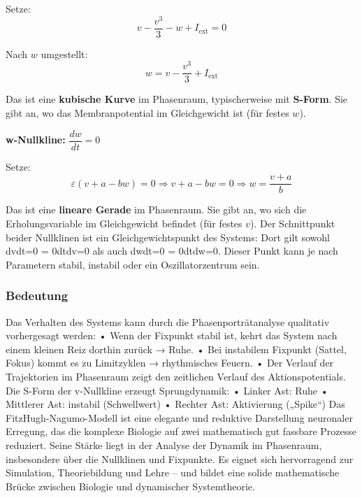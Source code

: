 \begin{refsection}
Setze:
\[
v - \frac{v^3}{3} - w + I_{\text{ext}} = 0
\]

Nach $w$ umgestellt:
\[
w = v - \frac{v^3}{3} + I_{\text{ext}}
\]

Das ist eine \textbf{kubische Kurve} im Phasenraum, typischerweise mit \textbf{S-Form}.  
Sie gibt an, wo das Membranpotential im Gleichgewicht ist (für festes $w$).

\vspace{1em}

\textbf{w-Nullkline:} $\dfrac{dw}{dt} = 0$

Setze:
\[
\varepsilon (v + a - b w) = 0 \Rightarrow v + a - b w = 0 \Rightarrow w = \frac{v + a}{b}
\]

Das ist eine \textbf{lineare Gerade} im Phasenraum.  
Sie gibt an, wo sich die Erholungsvariable im Gleichgewicht befindet (für festes $v$).
Der Schnittpunkt beider Nullklinen ist ein Gleichgewichtspunkt des Systems: Dort gilt sowohl dvdt=0 = 0dtdv=0 als auch dwdt=0 = 0dtdw=0. Dieser Punkt kann je nach Parametern stabil, instabil oder ein Oszillatorzentrum sein.
\subsubsection{Bedeutung}
Das Verhalten des Systems kann durch die Phasenporträtanalyse qualitativ vorhergesagt werden:
•	Wenn der Fixpunkt stabil ist, kehrt das System nach einem kleinen Reiz dorthin zurück → Ruhe.
•	Bei instabilem Fixpunkt (Sattel, Fokus) kommt es zu Limitzyklen → rhythmisches Feuern.
•	Der Verlauf der Trajektorien im Phasenraum zeigt den zeitlichen Verlauf des Aktionspotentials.
Die S-Form der v-Nullkline erzeugt Sprungdynamik:
•	Linker Ast: Ruhe
•	Mittlerer Ast: instabil (Schwellwert)
•	Rechter Ast: Aktivierung („Spike“)
Das FitzHugh-Nagumo-Modell ist eine elegante und reduktive Darstellung neuronaler Erregung, das die komplexe Biologie auf zwei mathematisch gut fassbare Prozesse reduziert. Seine Stärke liegt in der Analyse der Dynamik im Phasenraum, insbesondere über die Nullklinen und Fixpunkte. Es eignet sich hervorragend zur Simulation, Theoriebildung und Lehre – und bildet eine solide mathematische Brücke zwischen Biologie und dynamischer Systemtheorie.

%
%
%
%
%

\printbibliography[heading=subbibliography]
\end{refsection}
